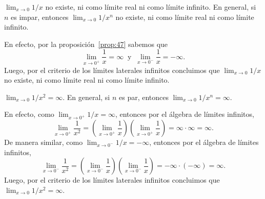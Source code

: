 \documentclass[12pt,a4paper]{book}
\begin{document}
    \begin{ejemplo}\label{ejm:58}
        $\lim_{x\to 0}1/x$ no existe, ni como límite real ni como límite infinito.
        En general, si $n$ es impar, entonces $\lim_{x\to 0}1/x^{n}$ no existe, ni como límite real
        ni como límite infinito.

        En efecto, por la proposición~\ref{prop:47} sabemos que
        \begin{equation*}
            \lim_{x\to 0^{+}}\frac{1}{x}=\infty\ \text{ y }\ \lim_{x\to 0^{-}}\frac{1}{x}=-\infty.
        \end{equation*}
        Luego, por el criterio de los límites laterales infinitos concluimos que $\lim_{x\to 0}1/x$
        no existe, ni como límite real ni como límite infinito.
    \end{ejemplo}

    \begin{ejemplo}\label{ejm:59}
        $\lim_{x\to 0}1/x^{2}=\infty$. En general, si $n$ es par, entonces $\lim_{x\to 0}1/x^{n}=
        \infty$.

        En efecto, como $\lim_{x\to 0^{+}}1/x=\infty$, entonces por el álgebra de límites
        infinitos,
        \begin{equation*}
            \lim_{x\to 0^{+}}\frac{1}{x^{2}}=\left(\lim_{x\to 0^{+}}\frac{1}{x}\right)\left(\lim_{x\to 0^{+}}\frac{1}{x}\right)=\infty\cdot\infty=\infty.
        \end{equation*}
        De manera similar, como $\lim_{x\to 0^{-}}1/x=-\infty$, entonces por el álgebra de
        límites infinitos,
        \begin{equation*}
            \lim_{x\to 0^{-}}\frac{1}{x^{2}}=\left(\lim_{x\to 0^{-}}\frac{1}{x}\right)\left(\lim_{x\to 0^{-}}\frac{1}{x}\right)=-\infty\cdot(-\infty)=\infty.
        \end{equation*}
        Luego, por el criterio de los límites laterales infinitos concluimos que $\lim_{x\to 0}1/x^{2}=
        \infty$.
    \end{ejemplo}
\end{document}
